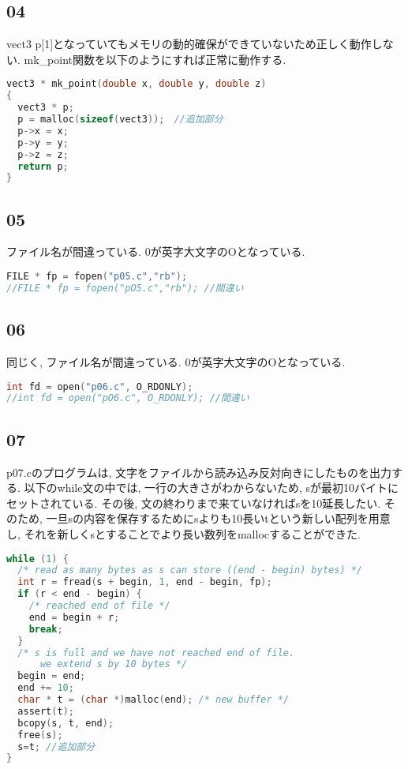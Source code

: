 \documentclass{ltjsarticle}
\begin{document}
\subsection{04}
vect3 p[1]となっていてもメモリの動的確保ができていないため正しく動作しない. mk\_point関数を以下のようにすれば正常に動作する. 
\begin{lstlisting}[caption=p04.c 変更部分,language=C]
vect3 * mk_point(double x, double y, double z)
{
  vect3 * p;
  p = malloc(sizeof(vect3));　//追加部分
  p->x = x;
  p->y = y;
  p->z = z;
  return p;
}
\end{lstlisting}
\subsection{05}
ファイル名が間違っている. 0が英字大文字のOとなっている. 
\begin{lstlisting}[caption=p05.c 変更部分,language=C]
FILE * fp = fopen("p05.c","rb");
//FILE * fp = fopen("pO5.c","rb"); //間違い
\end{lstlisting}
\subsection{06}
同じく, ファイル名が間違っている. 0が英字大文字のOとなっている. 
\begin{lstlisting}[caption=p06.c 変更部分,language=C]
int fd = open("p06.c", O_RDONLY);
//int fd = open("pO6.c", O_RDONLY); //間違い
\end{lstlisting}
\subsection{07}
p07.cのプログラムは, 文字をファイルから読み込み反対向きにしたものを出力する. 以下のwhile文の中では, 一行の大きさがわからないため, sが最初10バイトにセットされている. その後, 文の終わりまで来ていなければsを10延長したい. そのため, 一旦sの内容を保存するためにsよりも10長いtという新しい配列を用意し, それを新しくsとすることでより長い数列をmallocすることができた. 
\begin{lstlisting}[caption=p07.c 変更部分,language=C]
while (1) {
  /* read as many bytes as s can store ((end - begin) bytes) */
  int r = fread(s + begin, 1, end - begin, fp);
  if (r < end - begin) {
    /* reached end of file */
    end = begin + r;
    break;
  }
  /* s is full and we have not reached end of file.
      we extend s by 10 bytes */
  begin = end;
  end += 10;
  char * t = (char *)malloc(end); /* new buffer */
  assert(t);
  bcopy(s, t, end);
  free(s);
  s=t; //追加部分
}
\end{lstlisting}
\end{document}
